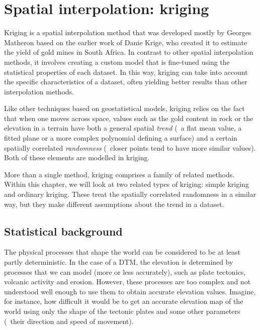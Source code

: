 
\setchapterpreamble[u]{\margintoc}


\graphicspath{{kriging/}}

\chapter{Spatial interpolation: kriging}%
\label{chap:kriging}

Kriging is a spatial interpolation method that was developed mostly by Georges Matheron based on the earlier work of Danie Krige, who created it to estimate the yield of gold mines in South Africa.
In contrast to other spatial interpolation methods, it involves creating a custom model that is fine-tuned using the statistical properties of each dataset.
In this way, kriging can take into account the specific characteristics of a dataset, often yielding better results than other interpolation methods.

Like other techniques based on geostatistical models, kriging relies on the fact that when one moves across space, values such as the gold content in rock or the elevation in a terrain have both a general spatial \emph{trend} (\eg\ a flat mean value, a fitted plane or a more complex polynomial defining a surface) and a certain spatially correlated \emph{randomness} (\ie\ closer points tend to have more similar values).
Both of these elements are modelled in kriging.

More than a single method, kriging comprises a family of related methods.
Within this chapter, we will look at two related types of kriging: simple kriging and ordinary kriging.
These treat the spatially correlated randomness in a similar way, but they make different assumptions about the trend in a dataset.

\section{Statistical background}

The physical processes that shape the world can be considered to be at least partly deterministic.
In the case of a DTM, the elevation is determined by processes that we can model (more or less accurately), such as plate tectonics, volcanic activity and erosion.
However, these processes are too complex and not understood well enough to use them to obtain accurate elevation values.
Imagine, for instance, how difficult it would be to get an accurate elevation map of the world using only the shape of the tectonic plates and some other parameters (\eg\ their direction and speed of movement).

